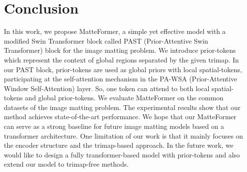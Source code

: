\documentclass[10pt,twocolumn,letterpaper]{article}
\begin{document}
\section{Conclusion}

In this work, we propose MatteFormer, a simple yet effective model with a modified Swin Transformer block called PAST (Prior-Attentive Swin Transformer) block for the image matting problem.
We introduce prior-tokens which represent the context of global regions separated by the given trimap. In our PAST block, prior-tokens are used as global priors with local spatial-tokens, participating at the self-attention mechanism in the PA-WSA (Prior-Attentive Window Self-Attention) layer. So, one token can attend to both local spatial-tokens and global prior-tokens.
We evaluate MatteFormer on the common datasets of the image matting problem. The experimental results show that our method achieves state-of-the-art performance.
We hope that our MatteFormer can serve as a strong baseline for future image matting models based on a transformer architecture.
One limitation of our work is that it mainly focuses on the encoder structure and the trimap-based approach. In the future work, we would like to design a fully transformer-based model with prior-tokens and also extend our model to trimap-free methods.

\clearpage
{\small


}
\end{document}
